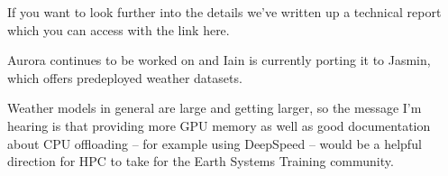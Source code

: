 \documentclass{article}
\begin{document}
If you want to look further into the details we've written up a technical report which you can access with the link here.

Aurora continues to be worked on and Iain is currently porting it to Jasmin, which offers predeployed weather datasets.

Weather models in general are large and getting larger, so the message I'm hearing is that providing more GPU memory as well as good documentation about CPU offloading -- for example using DeepSpeed -- would be a helpful direction for HPC to take for the Earth Systems Training community.


\fontsize{7pt}{8pt}{}


\end{document}
